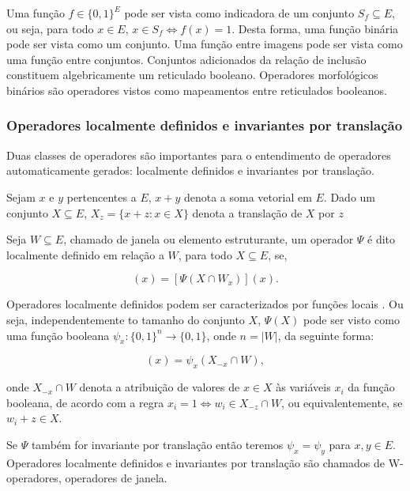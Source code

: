 \documentclass[a4paper,11pt]{article}
\begin{document}
    Uma função $f \in \{ 0, 1 \}^E$ pode ser vista como indicadora de um conjunto $S_f \subseteq E$, ou seja, para todo $x \in E$, $x \in S_f \Leftrightarrow f(x) = 1$. Desta forma, uma função binária pode ser vista como um conjunto. Uma função entre imagens pode ser vista como uma função entre conjuntos. Conjuntos adicionados da relação de inclusão constituem algebricamente um reticulado booleano. Operadores morfológicos binários são operadores vistos como mapeamentos entre reticulados booleanos.

  \subsubsection{Operadores localmente definidos e invariantes por translação}

    Duas classes de operadores são importantes para o entendimento de operadores automaticamente gerados: localmente definidos e invariantes por translação.

    Sejam $x$ e $y$ pertencentes a $E$, $x + y$ denota a soma vetorial em $E$. Dado um conjunto $X \subseteq E$, $X_z = \{ x + z \colon x \in X \}$ denota a translação de $X$ por $z$

    Seja $W \subseteq E$, chamado de janela ou elemento estruturante, um operador $\Psi$ é dito localmente definido em relação a $W$, para todo $X \subseteq E$, se,

    \begin{equation}
      [\Psi(X)](x) = [\Psi(X \cap W_x)](x).
    \end{equation}

    Operadores localmente definidos podem ser caracterizados por funções locais \cite{Tomita:1996:PrAuMa}. Ou seja, independentemente to tamanho do conjunto $X$, $\Psi(X)$ pode ser visto como uma função booleana $\psi_x \colon \{0, 1\}^n \rightarrow \{0, 1\}$, onde $n = |W|$, da seguinte forma:

    \begin{equation}
      [\Psi(X)](x) = \psi_x(X_{-x} \cap W),
    \end{equation}

    onde $X_{-x} \cap W$ denota a atribuição de valores de $x \in X$ às variáveis $x_i$ da função booleana, de acordo com a regra $x_i = 1 \Leftrightarrow w_i \in X_{-z} \cap W$, ou equivalentemente, se $w_i + z \in X$.

    Se $\Psi$ também for invariante por translação então teremos $\psi_x = \psi_y$ para $x, y \in E$. Operadores localmente definidos e invariantes por translação são chamados de W-operadores, operadores de janela.
\end{document}
